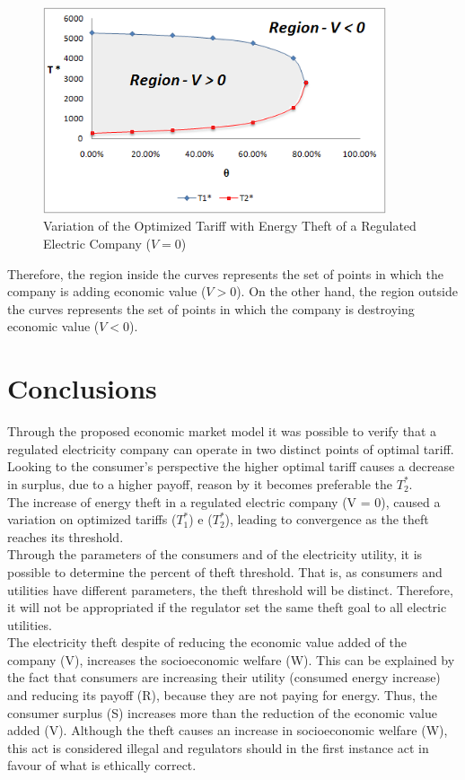 \documentclass[10pt, letterpaper]{elsarticle}
\begin{document}
\begin{figure}[h]%
\centering
\includegraphics[width = 0.9\textwidth]{Fig12.png} 
\caption{Variation of the Optimized Tariff with Energy Theft of a Regulated Electric Company ($V = 0$)}
\label{Fig12}
\end{figure}
Therefore, the region inside the curves represents the set of points in which the company is adding economic value ($V > 0$). On the other hand, the region outside the curves represents the set of points in which the company is destroying economic value ($V < 0$).

\section{Conclusions}
\label{S.5}
Through the proposed economic market model it was possible to verify that a regulated electricity company can operate in two distinct points of optimal tariff. Looking to the consumer's perspective the higher optimal tariff causes a decrease in surplus, due to a higher payoff, reason by it becomes preferable the $T_2^*$.\\
The increase of energy theft in a regulated electric company (V = 0), caused a variation on optimized tariffs ($T_1^*$) e ($T_2^*$), leading to convergence as the theft reaches its threshold.\\
Through the parameters of the consumers and of the electricity utility, it is possible to determine the percent of theft threshold. That is, as consumers and utilities have different parameters, the theft threshold will be distinct. Therefore, it will not be appropriated if the regulator set the same theft goal to all electric utilities.\\
The electricity theft despite of reducing the economic value added of the company (V), increases the socioeconomic welfare (W). This can be explained by the fact that consumers are increasing their utility (consumed energy increase) and reducing its payoff (R), because they are not paying for energy. Thus, the consumer surplus (S) increases more than the reduction of the economic value added (V). Although the theft causes an increase in socioeconomic welfare (W), this act is considered illegal and regulators should in the first instance act in favour of what is ethically correct.\\
\end{document}
